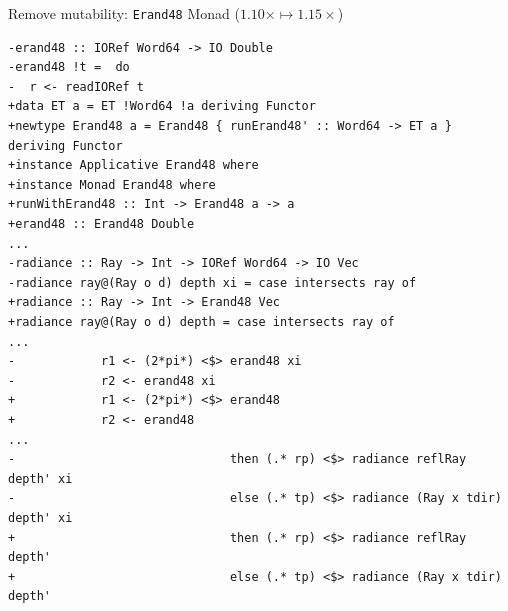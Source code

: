 \documentclass[8pt]{beamer}
\begin{document}
\begin{frame}[fragile]{Remove mutability: \texttt{Erand48} Monad ($1.10\times \mapsto 1.15\times$)}


\begin{verbatim}
-erand48 :: IORef Word64 -> IO Double
-erand48 !t =  do
-  r <- readIORef t
+data ET a = ET !Word64 !a deriving Functor
+newtype Erand48 a = Erand48 { runErand48' :: Word64 -> ET a } deriving Functor
+instance Applicative Erand48 where
+instance Monad Erand48 where
+runWithErand48 :: Int -> Erand48 a -> a                                                                                                
+erand48 :: Erand48 Double
...
-radiance :: Ray -> Int -> IORef Word64 -> IO Vec
-radiance ray@(Ray o d) depth xi = case intersects ray of
+radiance :: Ray -> Int -> Erand48 Vec
+radiance ray@(Ray o d) depth = case intersects ray of
...
-            r1 <- (2*pi*) <$> erand48 xi
-            r2 <- erand48 xi
+            r1 <- (2*pi*) <$> erand48
+            r2 <- erand48
...
-                              then (.* rp) <$> radiance reflRay depth' xi
-                              else (.* tp) <$> radiance (Ray x tdir) depth' xi
+                              then (.* rp) <$> radiance reflRay depth'
+                              else (.* tp) <$> radiance (Ray x tdir) depth'
\end{verbatim}


\end{frame}
\end{document}
